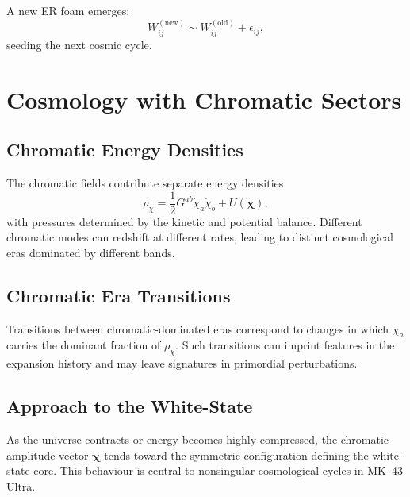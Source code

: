 A new ER foam emerges:
\[
W_{ij}^{(\text{new})} \sim W_{ij}^{(\text{old})} + \epsilon_{ij},
\]
seeding the next cosmic cycle.


\chapter{Cosmology with Chromatic Sectors}

\section{Chromatic Energy Densities}

The chromatic fields contribute separate energy densities
\[
  \rho_\chi =
  \frac{1}{2} G^{ab} \dot{\chi}_a \dot{\chi}_b + U(\bm{\chi}),
\]
with pressures determined by the kinetic and potential balance.
Different chromatic modes can redshift at different rates, leading to distinct cosmological eras dominated by different bands.

\section{Chromatic Era Transitions}

Transitions between chromatic-dominated eras correspond to changes in which $\chi_a$ carries the dominant fraction of $\rho_\chi$.
Such transitions can imprint features in the expansion history and may leave signatures in primordial perturbations.

\section{Approach to the White-State}

As the universe contracts or energy becomes highly compressed, the chromatic amplitude vector $\bm{\chi}$ tends toward the symmetric configuration defining the white-state core.
This behaviour is central to nonsingular cosmological cycles in MK--43 Ultra.


